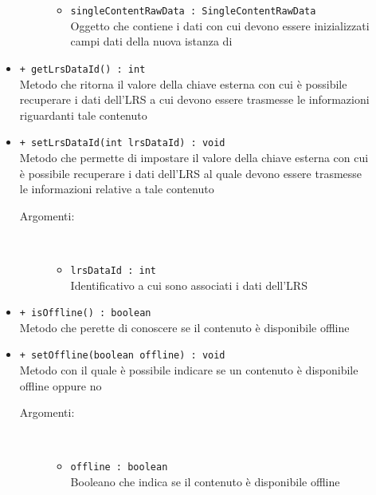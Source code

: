 \documentclass[../Tesi.tex]{subfiles}
\begin{document}
\begin{description}
\begin{itemize}
\begin{description}
\begin{itemize}
						\item \texttt{singleContentRawData : SingleContentRawData}\\
						Oggetto che contiene i dati con cui devono essere inizializzati campi dati della nuova istanza di 
					\end{itemize}
				\end{description}

				\item \texttt{+ getLrsDataId() : int}\\
				Metodo che ritorna il valore della chiave esterna con cui è possibile recuperare i dati dell'LRS a cui devono essere trasmesse le informazioni riguardanti tale contenuto

				\item \texttt{+ setLrsDataId(int lrsDataId) : void}\\
				Metodo che permette di impostare il valore della chiave esterna con cui è possibile recuperare i dati dell'LRS al quale devono essere trasmesse le informazioni relative a tale contenuto
				\begin{description}
					\item[Argomenti:] \
					\begin{itemize}
						\item \texttt{lrsDataId : int}\\
						Identificativo a cui sono associati i dati dell'LRS
					\end{itemize}
				\end{description}

				\item \texttt{+ isOffline() : boolean}\\
				Metodo che perette di conoscere se il contenuto è disponibile offline

				\item \texttt{+ setOffline(boolean offline) : void}\\
				Metodo con il quale è possibile indicare se un contenuto è disponibile offline oppure no
				\begin{description}
					\item[Argomenti:] \
					\begin{itemize}
						\item \texttt{offline : boolean}\\
						Booleano che indica se il contenuto è disponibile offline
					\end{itemize}
				\end{description}


\end{itemize}
\end{description}
\end{document}
